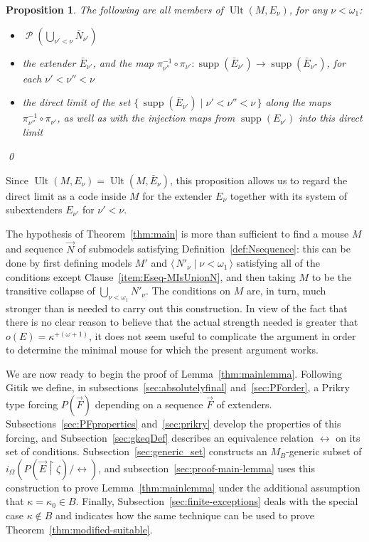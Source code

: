 \documentclass[
twoside,
]{article}
\newtheorem{proposition}[theorem]{Proposition}
\theoremstyle{definition}
\theoremstyle{remark}
\DeclareMathOperator{\supp}{supp}   %
\newcommand{\ords}{\Omega}
\newcommand\gkeq{\leftrightarrow}
\newcommand\mgkeq{/{\gkeq}}
\DeclareMathOperator{\ps}{\mathcal{P}}
\newcommand{\set}[1]{\{\,#1\,\}}
\newcommand{\pair}[1]{\langle#1\rangle}
\newcommand{\seq}[1]{\pair{\,#1\,}}
\DeclareMathOperator{\ult}{Ult}
\newcommand{\restrict}{{\upharpoonright}}
\begin{document}
\begin{proposition}\label{thm:EnuinM}  The following are all members
  of $\ult(M,E_{\nu})$, for any $\nu<\omega_1$:
  \begin{itemize}
   \item \label{item:Nseq-powerset}$\ps(\bigcup_{\nu'<\nu}\bar     N_{\nu'})$
   \item the extender $\bar E_{\nu'}$, and the map $\pi_{\nu''}^{-1}\circ \pi_{\nu'}\colon
     \supp(\bar E_{\nu'})\to\supp(\bar E_{\nu''})$, for each $\nu'<\nu''<\nu$
   \item the direct limit of the set $\set{\supp(\bar E_{\nu'})\mid
       \nu'<\nu''<\nu}$ along the maps $\pi_{\nu''}^{-1}\circ
       \pi_{\nu'}$, as well as with the injection maps from
       $\supp(E_{\nu'})$ into this direct limit
  \end{itemize}\qed
\end{proposition}
Since $\ult(M,E_{\nu})=\ult(M,\bar E_{\nu})$, this proposition allows
us to regard the direct limit as a code inside $M$ for the extender
$E_{\nu}$ together with its system of
subextenders $E_{\nu'}$ for $\nu'<\nu$.

The hypothesis of Theorem~\ref{thm:main} is more than sufficient to
find a 
mouse $M$ and sequence $\vec N$ of submodels satisfying
Definition~\ref{def:Nsequence}: this can be done  by first defining models $M'$ and
$\seq{N'_{\nu}\mid 
  \nu<\omega_1}$ satisfying all of the conditions except
Clause~\ref{item:Eseq-MIsUnionN}, and then taking $M$ to be the
transitive collapse of $\bigcup_{\nu<\omega_1} N'_{\nu}$.    The
conditions on $M$ are, in turn, much stronger than is needed to carry out
this construction.  In view of the fact that there is
no clear reason to believe that the actual strength needed is greater
that $o(E)=\kappa^{+(\omega+1)}$, it does not seem useful  to
complicate the argument in order to determine the minimal mouse for which
the present argument works.

\medskip{}

We are now ready to begin the proof of Lemma~\ref{thm:mainlemma}.
Following Gitik we define, in subsections~\ref{sec:absolutelyfinal} and~\ref{sec:PForder}, a Prikry type forcing
$P(\vec F)$ depending on a sequence $\vec F$ of extenders.
Subsections~\ref{sec:PFproperties} and~\ref{sec:prikry} develop the
properties of this forcing, and Subsection~\ref{sec:gkeqDef} describes an equivalence
relation $\gkeq$ on its set of conditions.
Subsection~\ref{sec:generic_set} constructs an $M_B$-generic subset of
$i_{\ords}(P(\vec E\restrict\zeta)\mgkeq)$, and
subsection~\ref{sec:proof-main-lemma} uses this construction to prove
Lemma~\ref{thm:mainlemma} under the additional assumption that
$\kappa=\kappa_0\in B$.   Finally, 
Subsection~\ref{sec:finite-exceptions} deals with the special case
$\kappa\notin B$ and indicates how the same  technique can be used to prove
Theorem~\ref{thm:modified-suitable}. 
\end{document}
